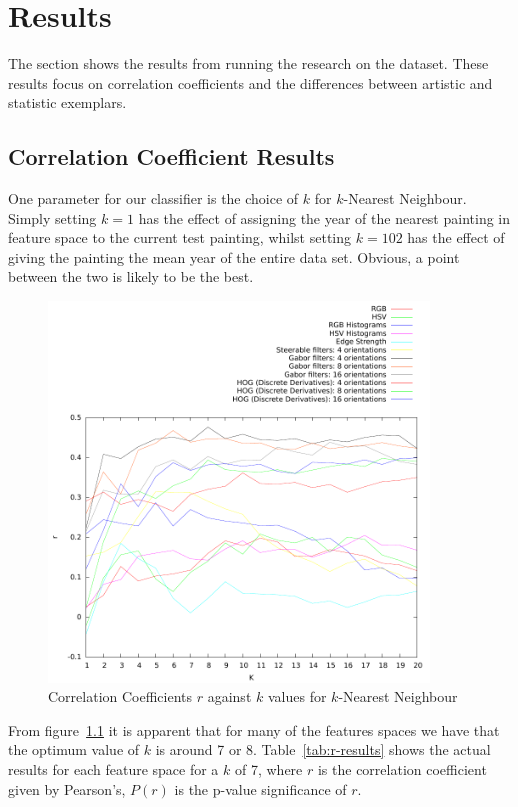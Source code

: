 \chapter{Results}

The section shows the results from running the research on the dataset. These results focus on 
correlation coefficients and the differences between artistic and statistic exemplars.

\section{Correlation Coefficient Results}
One parameter for our classifier is the choice of $k$ for $k$-Nearest Neighbour. Simply setting 
$k=1$ has the effect of assigning the year of the nearest painting in feature space to the current
test painting, whilst setting $k=102$ has the effect of giving the painting the mean year of the 
entire data set. Obvious, a point between the two is likely to be the best. 

\begin{figure}[h]
\centering
\includegraphics[width=0.9\textwidth]{../../isispa-paper/results/mean}
\caption{Correlation Coefficients $r$ against $k$ values for $k$-Nearest Neighbour}\label{fig:r-graph}
\end{figure}

From figure~\ref{fig:r-graph} it is apparent that for many of the features spaces we have that the 
optimum value of $k$ is around 7 or 8. Table~\ref{tab:r-results} shows the actual results for each 
feature space for a $k$ of 7, where $r$ is the correlation coefficient given by Pearson's, 
$P(r)$ is the p-value significance of $r$.

